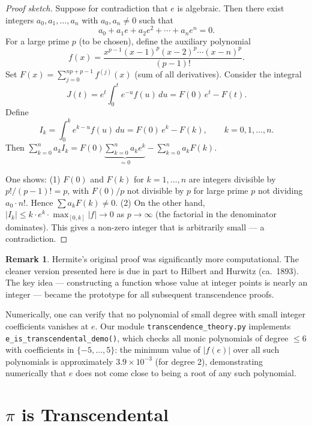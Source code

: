 \documentclass[12pt,a4paper]{amsart}
\theoremstyle{definition}
\newtheorem{remark}[theorem]{Remark}
\begin{document}
\begin{proof}[Proof sketch]
Suppose for contradiction that $e$ is algebraic. Then there exist integers
$a_0, a_1, \ldots, a_n$ with $a_0, a_n \neq 0$ such that
\[
  a_0 + a_1 e + a_2 e^2 + \cdots + a_n e^n = 0.
\]
For a large prime $p$ (to be chosen), define the auxiliary polynomial
\[
  f(x) = \frac{x^{p-1}(x-1)^p(x-2)^p \cdots (x-n)^p}{(p-1)!}.
\]
Set $F(x) = \sum_{j=0}^{np+p-1} f^{(j)}(x)$ (sum of all derivatives).
Consider the integral
\[
  J(t) = e^t \int_0^t e^{-u} f(u)\,du = F(0)\,e^t - F(t).
\]
Define
\[
  I_k = \int_0^k e^{k-u} f(u)\,du = F(0)\,e^k - F(k), \qquad k = 0, 1, \ldots, n.
\]
Then $\sum_{k=0}^n a_k I_k = F(0) \underbrace{\sum_{k=0}^n a_k e^k}_{=0}
- \sum_{k=0}^n a_k F(k)$.

One shows: (1) $F(0)$ and $F(k)$ for $k = 1, \ldots, n$ are integers
divisible by $p!/(p-1)! = p$, with $F(0)/p$ not divisible by $p$ for large
prime $p$ not dividing $a_0 \cdot n!$. Hence $\sum a_k F(k) \neq 0$.
(2) On the other hand, $|I_k| \leq k \cdot e^k \cdot \max_{[0,k]} |f|
\to 0$ as $p \to \infty$ (the factorial in the denominator dominates).
This gives a non-zero integer that is arbitrarily small — a contradiction.
\end{proof}

\begin{remark}
Hermite's original proof was significantly more computational. The cleaner
version presented here is due in part to Hilbert and Hurwitz (ca.\ 1893).
The key idea — constructing a function whose value at integer points is nearly
an integer — became the prototype for all subsequent transcendence proofs.
\end{remark}

Numerically, one can verify that no polynomial of small degree with small
integer coefficients vanishes at $e$. Our module \texttt{transcendence\_theory.py}
implements \texttt{e\_is\_transcendental\_demo()}, which checks all monic
polynomials of degree $\leq 6$ with coefficients in $\{-5, \ldots, 5\}$:
the minimum value of $|f(e)|$ over all such polynomials is approximately
$3.9 \times 10^{-3}$ (for degree 2), demonstrating numerically that $e$ does
not come close to being a root of any such polynomial.


\section{\texorpdfstring{$\pi$ is Transcendental}{pi is Transcendental}}
\label{sec:pi-transcendental}
\end{document}
